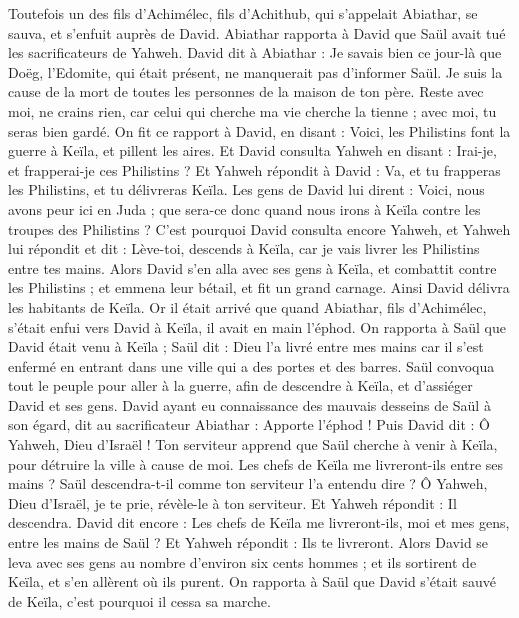 \begin{multicols}{2}
Toutefois un des fils d'Achimélec, fils d'Achithub, qui s'appelait Abiathar, se sauva, et s'enfuit auprès de David.
Abiathar rapporta à David que Saül avait tué les sacrificateurs de Yahweh.
David dit à Abiathar : Je savais bien ce jour-là que Doëg, l'Edomite, qui était présent, ne manquerait pas d'informer Saül. Je suis la cause de la mort de toutes les personnes de la maison de ton père.
Reste avec moi, ne crains rien, car celui qui cherche ma vie cherche la tienne ; avec moi, tu seras bien gardé.
\VerseOne{}On fit ce rapport à David, en disant : Voici, les Philistins font la guerre à Keïla, et pillent les aires.
Et David consulta Yahweh en disant : Irai-je, et frapperai-je ces Philistins ? Et Yahweh répondit à David : Va, et tu frapperas les Philistins, et tu délivreras Keïla.
Les gens de David lui dirent : Voici, nous avons peur ici en Juda ; que sera-ce donc quand nous irons à Keïla contre les troupes des Philistins ?
C'est pourquoi David consulta encore Yahweh, et Yahweh lui répondit et dit : Lève-toi, descends à Keïla, car je vais livrer les Philistins entre tes mains.
Alors David s'en alla avec ses gens à Keïla, et combattit contre les Philistins ; et emmena leur bétail, et fit un grand carnage. Ainsi David délivra les habitants de Keïla.
Or il était arrivé que quand Abiathar, fils d'Achimélec, s'était enfui vers David à Keïla, il avait en main l'éphod.
On rapporta à Saül que David était venu à Keïla ; Saül dit : Dieu l'a livré entre mes mains car il s'est enfermé en entrant dans une ville qui a des portes et des barres.
Saül convoqua tout le peuple pour aller à la guerre, afin de descendre à Keïla, et d'assiéger David et ses gens.
David ayant eu connaissance des mauvais desseins de Saül à son égard, dit au sacrificateur Abiathar : Apporte l'éphod !
Puis David dit : Ô Yahweh, Dieu d'Israël ! Ton serviteur apprend que Saül cherche à venir à Keïla, pour détruire la ville à cause de moi.
Les chefs de Keïla me livreront-ils entre ses mains ? Saül descendra-t-il comme ton serviteur l'a entendu dire ? Ô Yahweh, Dieu d'Israël, je te prie, révèle-le à ton serviteur. Et Yahweh répondit : Il descendra.
David dit encore : Les chefs de Keïla me livreront-ils, moi et mes gens, entre les mains de Saül ? Et Yahweh répondit : Ils te livreront.
Alors David se leva avec ses gens au nombre d'environ six cents hommes ; et ils sortirent de Keïla, et s'en allèrent où ils purent. On rapporta à Saül que David s'était sauvé de Keïla, c'est pourquoi il cessa sa marche.

\end{multicols}
